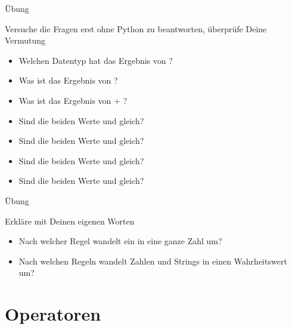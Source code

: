 	
	\begin{frame}{Übung}
		
		\begin{block}{Versuche die Fragen erst ohne Python zu beantworten, überprüfe Deine Vermutung}
			\begin{itemize}
				\item Welchen Datentyp hat das Ergebnis von  ?
				\item Was ist das Ergebnis von  ? 
				\item Was ist das Ergebnis von \py{"2"} + ? 
				\item Sind die beiden Werte  und  gleich? 
				\item Sind die beiden Werte  und  gleich? 
				\item Sind die beiden Werte  und  gleich? 
				\item Sind die beiden Werte  und  gleich? 
			\end{itemize}
		\end{block}
		
		
	\end{frame}

	\begin{frame}{Übung}
	
	\begin{block}{Erkläre mit Deinen eigenen Worten}
		\begin{itemize}
			\item Nach welcher Regel wandelt  ein  in eine ganze Zahl um? 
			\item Nach welchen Regeln wandelt  Zahlen und Strings in einen Wahrheitswert um? 
		\end{itemize}
	\end{block}
	
	
\end{frame}




\section{Operatoren}

